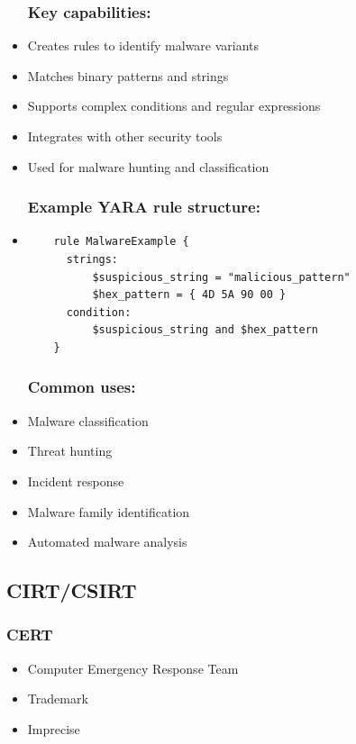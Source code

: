 \begin{itemize}
  \subsubsection*{Key capabilities:}
	\item Creates rules to identify malware variants
	\item Matches binary patterns and strings
	\item Supports complex conditions and regular expressions
	\item Integrates with other security tools
	\item Used for malware hunting and classification

  \subsubsection*{Example YARA rule structure:}
  \item \begin{lstlisting}
    rule MalwareExample {
      strings:
          $suspicious_string = "malicious_pattern"
          $hex_pattern = { 4D 5A 90 00 }
      condition:
          $suspicious_string and $hex_pattern
    }
    \end{lstlisting}

  \subsubsection*{Common uses:}
	\item Malware classification
	\item Threat hunting
	\item Incident response
	\item Malware family identification
	\item Automated malware analysis
\end{itemize}

\subsection{CIRT/CSIRT}

\subsubsection*{CERT}
\begin{itemize}
  \item Computer Emergency Response Team
  \item Trademark
  \item Imprecise
\end{itemize}

